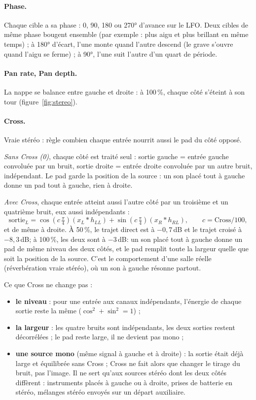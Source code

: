 \documentclass[a4paper,11pt]{article}
\newcommand{\dB}{\,dB}
\begin{document}
\paragraph{Phase.} Chaque cible a sa phase : 0, 90, 180 ou 270° d'avance sur le LFO. Deux cibles
de même phase bougent ensemble (par exemple : plus aigu et plus brillant en même temps) ; à 180°
d'écart, l'une monte quand l'autre descend (le grave s'ouvre quand l'aigu se ferme) ; à 90°,
l'une suit l'autre d'un quart de période.

\paragraph{Pan rate, Pan depth.} La nappe se balance entre gauche et droite : à 100\,\%, chaque
côté s'éteint à son tour (figure~\ref{fig:stereo}).

\paragraph{Cross.} Vraie stéréo : règle combien chaque entrée nourrit aussi le pad du côté
opposé.

\emph{Sans Cross (0)}, chaque côté est traité seul : sortie gauche = entrée gauche convoluée par
un bruit, sortie droite = entrée droite convoluée par un autre bruit, indépendant. Le pad garde la
position de la source : un son placé tout à gauche donne un pad tout à gauche, rien à droite.

\emph{Avec Cross}, chaque entrée atteint aussi l'autre côté par un troisième et un quatrième
bruit, eux aussi indépendants :
\[
\text{sortie}_L = \cos\!\left(c\,\tfrac{\pi}{4}\right) (x_L * h_{LL})
               + \sin\!\left(c\,\tfrac{\pi}{4}\right) (x_R * h_{RL}),
\qquad c = \text{Cross} / 100,
\]
et de même à droite. À 50\,\%, le trajet direct est à $-0{,}7$\dB{} et le trajet croisé à
$-8{,}3$\dB ; à 100\,\%, les deux sont à $-3$\dB : un son placé tout à gauche donne un pad de même
niveau des deux côtés, et le pad remplit toute la largeur quelle que soit la position de la
source. C'est le comportement d'une salle réelle (réverbération \og vraie stéréo\fg), où un son à
gauche résonne partout.

Ce que Cross ne change pas :
\begin{itemize}
\item \textbf{le niveau} : pour une entrée aux canaux indépendants, l'énergie de chaque sortie
  reste la même ($\cos^2 + \sin^2 = 1$) ;
\item \textbf{la largeur} : les quatre bruits sont indépendants, les deux sorties restent
  décorrélées ; le pad reste large, il ne devient pas mono ;
\item \textbf{une source mono} (même signal à gauche et à droite) : la sortie était déjà large et
  équilibrée sans Cross ; Cross ne fait alors que changer le tirage du bruit, pas l'image. Il ne
  sert qu'aux sources stéréo dont les deux côtés diffèrent : instruments placés à gauche ou à
  droite, prises de batterie en stéréo, mélanges stéréo envoyés sur un départ auxiliaire.
\end{itemize}
\end{document}
